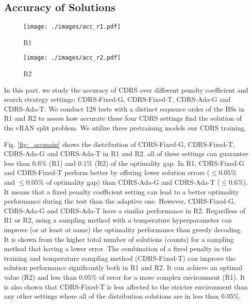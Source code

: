 %

\vspace{-2mm}
\subsection{Accuracy of Solutions}
%
%
\begin{figure*}[t]
	\centering
	\begin{subfigure}[t]{.47\textwidth}
		\centering
		\texttt{[image: ./images/acc\_r1.pdf]}
		\small\caption{\small R1}
	\end{subfigure}
	\begin{subfigure}[t]{.47\textwidth}
		\centering
		\texttt{[image: ./images/acc\_r2.pdf]}
		\small\caption{\small R2}
	\end{subfigure}	
	\caption{\small \textbf{Histogram of CDRS accuracy in (a) R1 and (b) R2.} The accuracy is calculated over 128 tests. CDRS-Ada-T and CDRS-Fixed-T are set with $T=15$ and $16$ samples.} 	\label{fig:_accmain}
	\vspace{-3mm}	
\end{figure*}


In this part, we study the accuracy of CDRS over different penalty coefficient and search strategy settings: CDRS-Fixed-G, CDRS-Fixed-T, CDRS-Ada-G and CDRS-Ada-T. We conduct 128 tests with a distinct sequence order of the BSs in R1 and R2 to assess how accurate these four CDRS settings find the solution of the vRAN split problem. We utilize three pretraining models  our CDRS training.

Fig. \ref{fig:_accmain} shows the distribution of  CDRS-Fixed-G, CDRS-Fixed-T, CDRS-Ada-G and CDRS-Ada-T in R1 and R2.  all of these settings can guarantee less than $0.6 \%$ (R1) and $0.1 \%$ (R2) of the optimality gap. In R1, CDRS-Fixed-G and CDRS-Fixed-T perform better by offering lower solution errors ($ \leq 0.05 \%$ and $\leq 0.05 \%$ of optimality gap) than CDRS-Ada-G and CDRS-Ada-T ($\leq 0.6 \%$). It means that a fixed penalty coefficient setting can lead to a better optimality performance during the test than the adaptive one. However, CDRS-Fixed-G, CDRS-Ada-G and CDRS-Ada-T have a similar performance in R2. Regardless of R1 or R2, using a sampling method with a temperature hyperparameter can improve (or at least at same) the optimality performance than greedy decoding. It is shown from the higher total number of solutions (counts) for a sampling method that having a lower error. The combination of a fixed penalty in the training and temperature sampling method (CDRS-Fixed-T) can improve the solution performance significantly both in R1 and R2. It can achieve an optimal value (R2) and less than $0.05 \%$ of error for a more complex environment (R1). It is also shown that CDRS-Fixed-T is less affected to the stricter environment than any other settings where all of the distribution solutions are in less than $0.05 \%$.


